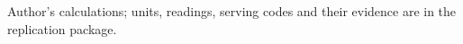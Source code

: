 \begin{table}[tp]
\begin{tablenotes}
\end{tablenotes}
\begin{tablenotes}[Source]
Author's calculations; units, readings, serving codes and their evidence are in the replication package.
\end{tablenotes}
\end{table}
